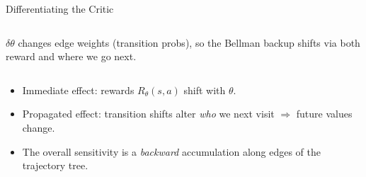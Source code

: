 \documentclass[lecture]{beamer}
\begin{document}
\begin{frame}{\normalsize Differentiating the Critic }
\begin{columns}[T]
{\scriptsize  $\delta\theta$ changes edge weights (transition probs), so the Bellman backup shifts via both reward and where we go next.}
\end{columns}
\begin{itemize}
\item Immediate effect: rewards $R_\theta(s,a)$ shift with $\theta$.
\item Propagated effect: transition shifts alter \emph{who} we next visit $\Rightarrow$ future values change.
\item The overall sensitivity is a \textit{backward} accumulation along edges of the trajectory tree.
\end{itemize}

\end{frame}
\end{document}
